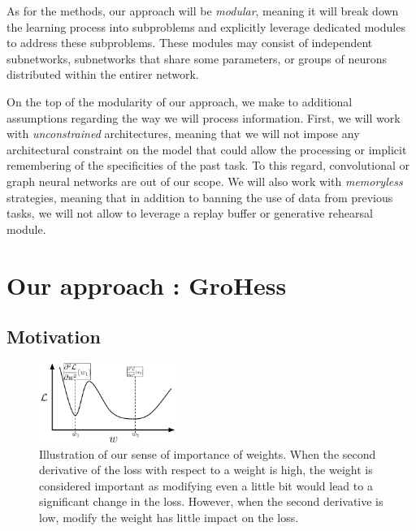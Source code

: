 \documentclass[twocolumn]{article}
\begin{document}
\vspace{2mm}
\noindent
As for the methods, our approach will be \textit{modular}, meaning it will break down the learning process into subproblems and explicitly leverage dedicated modules to address these subproblems. These modules may consist of independent subnetworks, subnetworks that share some parameters, or groups of neurons distributed within the entirer network.

\vspace{2mm}
\noindent
On the top of the modularity of our approach, we make to additional assumptions regarding the way we will process information. First, we will work with \textit{unconstrained} architectures, meaning that we will not impose any architectural constraint on the model that could allow the processing or implicit remembering of the specificities of the past task. To this regard, convolutional or graph neural networks are out of our scope. We will also work with \textit{memoryless} strategies, meaning that in addition to banning the use of data from previous tasks, we will not allow to leverage a replay buffer or generative rehearsal module.




\section{Our approach : GroHess}



\subsection{Motivation}


\begin{figure}
    \centering
    \includegraphics[width=0.40\textwidth]{images/motivation_GroHess.png}
    \caption{Illustration of our sense of importance of weights. When the second derivative of the loss with respect to a weight is high, the weight is considered important as modifying even a little bit would lead to a significant change in the loss. However, when the second derivative is low, modify the weight has little impact on the loss.}
    \label{fig:motivation_GroHess}
\end{figure}
\end{document}
